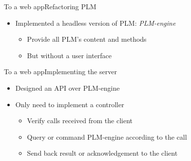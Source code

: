 \documentclass{beamer}
\begin{document}
\begin{frame}{To a web app}{Refactoring PLM}
  \begin{itemize}
  \item {
    Implemented a headless version of PLM: \emph{PLM-engine}
    \begin{itemize}
    \item Provide all PLM's content and methods
    \item But without a user interface
    \end{itemize}
  }
  \end{itemize}
  \begin{center}
  \end{center}
\end{frame}

\begin{frame}{To a web app}{Implementing the server}
  \begin{itemize}
  \item {
    Designed an API over PLM-engine
  }
  \item {
    Only need to implement a controller
    \begin{itemize}
    \item Verify calls received from the client
    \item Query or command PLM-engine according to the call
    \item Send back result or acknowledgement to the client
    \end{itemize}
  }
  \end{itemize}
\end{frame}
\end{document}
